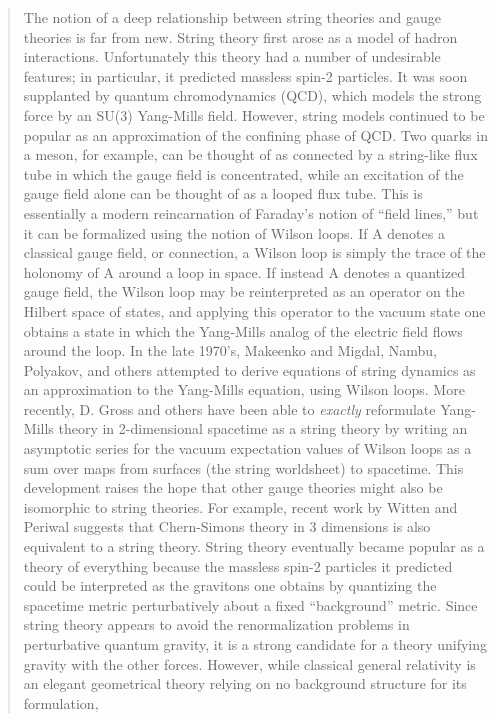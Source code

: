 \begin{quote}
The notion of a deep relationship between string theories
and gauge theories is far from new.  String theory first arose as a
model of hadron interactions.  Unfortunately this theory had a number of undesirable features; in particular, it predicted massless spin-2 particles.
It was soon supplanted by quantum chromodynamics (QCD), which models the
strong force by an SU(3) Yang-Mills field.   However, string
models continued to be popular as an approximation of the confining phase
of QCD.  Two quarks in a meson, for example, can be thought of as
connected by a string-like flux tube in which the gauge field is
concentrated, while an excitation of the gauge field alone can be
thought of as a looped flux tube.   This is essentially a modern
reincarnation of Faraday's notion of ``field lines,'' but it can be
formalized using the notion of Wilson loops.  If A denotes a classical
gauge field, or connection, a Wilson loop is simply the trace of the
holonomy of A around a loop in space.  If instead A denotes a quantized
gauge field, the Wilson loop may be reinterpreted as an operator on the
Hilbert space of states, and applying this operator to the vacuum state
one obtains a state in which the Yang-Mills analog of the electric field
flows around the loop.
In the late 1970's, Makeenko and Migdal, Nambu, Polyakov, and others
attempted to derive equations of string dynamics as an approximation to 
the Yang-Mills equation, using Wilson loops.   More recently, D. Gross
and others have been able to \emph{exactly} reformulate Yang-Mills theory in
2-dimensional spacetime as a string theory by writing an asymptotic
series for the vacuum expectation values of Wilson loops as a sum over
maps from surfaces (the string worldsheet) to spacetime.   This
development raises the hope that other gauge theories might also be
isomorphic to string theories.  For example, recent work by Witten and
Periwal  suggests that Chern-Simons theory in 3 dimensions is also
equivalent to a string theory. 
String theory eventually became popular as a theory of everything
because the massless spin-2 particles it predicted could be interpreted
as the gravitons one obtains by quantizing the spacetime
metric perturbatively about a fixed ``background'' metric.  Since
string theory appears to avoid the renormalization problems in
perturbative quantum gravity, it is a strong candidate for a theory
unifying gravity with the other forces.  
However, while classical general relativity is an elegant
geometrical theory relying on no background structure for its formulation, 

\end{quote}
